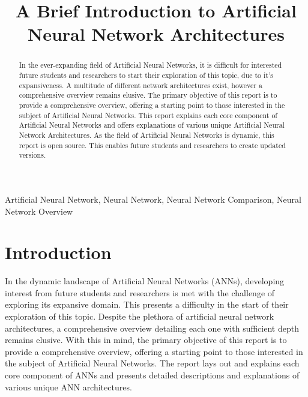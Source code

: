 \documentclass[conference]{IEEEtran}
\begin{document}
\title{A Brief Introduction to Artificial Neural Network Architectures}

\author{
}

\maketitle

\begin{abstract}
In the ever-expanding field of Artificial Neural Networks, it is difficult for interested future students and researchers to start their exploration of this topic, due to it's expansiveness. A multitude of different network architectures exist, however a comprehensive overview remains elusive. The primary objective of this report is to provide a comprehensive overview, offering a starting point to those interested in the subject of Artificial Neural Networks. This report explains each core component of Artificial Neural Networks and offers explanations of various unique Artificial Neural Network Architectures. As the field of Artificial Neural Networks is dynamic, this report is open source. This enables future students and researchers to create updated versions.
\end{abstract}

\begin{IEEEkeywords}
Artificial Neural Network, Neural Network, Neural Network Comparison, Neural Network Overview
\end{IEEEkeywords}

\section{Introduction}

In the dynamic landscape of Artificial Neural Networks (ANNs), developing interest from future students and researchers is met with the challenge of exploring its expansive domain. This presents a difficulty in the start of their exploration of this topic. Despite the plethora of artificial neural network architectures, a comprehensive overview detailing each one with sufficient depth remains elusive. With this in mind, the primary objective of this report is to provide a comprehensive overview, offering a starting point to those interested in the subject of Artificial Neural Networks. The report lays out and explains each core component of ANNs and presents detailed descriptions and explanations of various unique ANN architectures.
\end{document}
